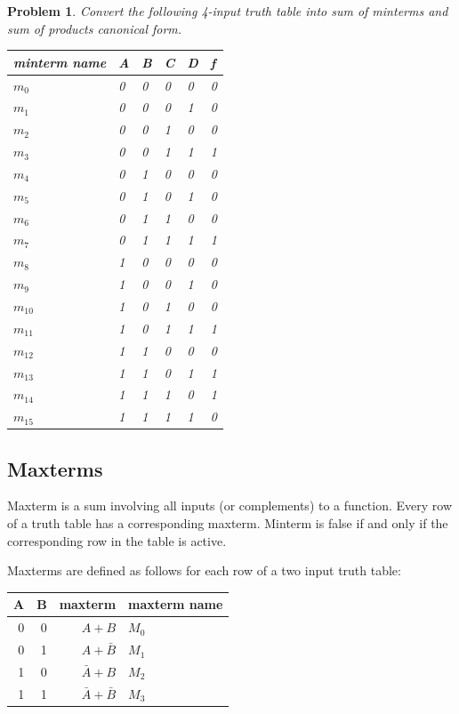 \documentclass{article}
\newtheorem{prob}{Problem}
\begin{document}
\begin{prob}
  Convert the following 4-input truth table into sum of minterms and sum of products canonical form.

  \noindent
  \begin{tabular}{p{20mm}llll|l}
    \toprule
    minterm name & A & B & C & D & f \\
    \midrule
    $m_0$ & 0 & 0 & 0 & 0 & 0 \\ 
    $m_1$ & 0 & 0 & 0 & 1 & 0 \\ 
    $m_2$ & 0 & 0 & 1 & 0 & 0 \\ 
    $m_3$ & 0 & 0 & 1 & 1 & 1 \\ 
    $m_4$ & 0 & 1 & 0 & 0 & 0 \\ 
    $m_5$ & 0 & 1 & 0 & 1 & 0 \\ 
    $m_6$ & 0 & 1 & 1 & 0 & 0 \\ 
    $m_7$ & 0 & 1 & 1 & 1 & 1 \\ 
    $m_8$ & 1 & 0 & 0 & 0 & 0 \\ 
    $m_9$ & 1 & 0 & 0 & 1 & 0 \\ 
    $m_{10}$ & 1 & 0 & 1 & 0 & 0 \\
    $m_{11}$ & 1 & 0 & 1 & 1 & 1 \\
    $m_{12}$ & 1 & 1 & 0 & 0 & 0 \\
    $m_{13}$ & 1 & 1 & 0 & 1 & 1 \\
    $m_{14}$ & 1 & 1 & 1 & 0 & 1 \\
    $m_{15}$ & 1 & 1 & 1 & 1 & 0 \\
    \bottomrule
  \end{tabular}
\end{prob}


\subsection{Maxterms}
Maxterm is a sum involving all inputs (or complements) to a function.
Every row of a truth table has a corresponding maxterm.
Minterm is false if and only if the corresponding row in the table is active.

Maxterms are defined as follows for each row of a two input truth table:\\
\begin{tabular}{rrrp{20mm}}
  \toprule
  A & B &  maxterm & maxterm name\\
  \midrule
  0 & 0 &  $A + B$ & $M_0$ \\
  0 & 1 &  $A + \bar{B} $ & $M_1$ \\
  1 & 0 &  $\bar{A} + B$ & $M_2$ \\
  1 & 1 &  $\bar{A} + \bar{B} $ & $M_3$ \\
  \bottomrule
\end{tabular}\\[1em]
\end{document}

